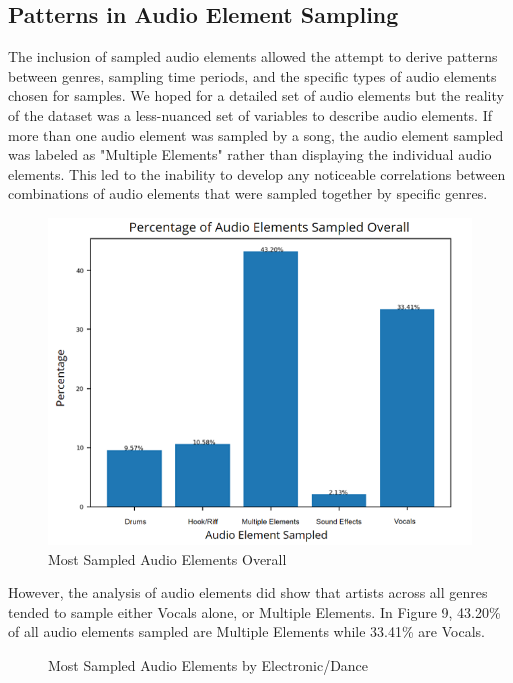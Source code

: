 \documentclass[pageno]{jpaper}
\begin{document}
\subsection{Patterns in Audio Element Sampling}
The inclusion of sampled audio elements allowed the attempt to derive patterns between genres, sampling time periods, and the specific types of audio elements chosen for samples. We hoped for a detailed set of audio elements but the reality of the dataset was a less-nuanced set of variables to describe audio elements. If more than one audio element was sampled by a song, the audio element sampled was labeled as "Multiple Elements" rather than displaying the individual audio elements. This led to the inability to develop any noticeable correlations between combinations of audio elements that were sampled together by specific genres.
\begin{figure}[H]
\centering
\includegraphics{audioElemSampledOverall}
\caption{Most Sampled Audio Elements Overall}
\label{fig:fig9}
\centering
\end{figure}
However, the analysis of audio elements did show that artists across all genres tended to sample either Vocals alone, or Multiple Elements. In Figure 9, 43.20\% of all audio elements sampled are Multiple Elements while 33.41\% are Vocals. 
\begin{figure}[H]
\centering
\caption{Most Sampled Audio Elements by Hip-Hop/R\&B}\caption{Most Sampled Audio Elements by Electronic/Dance}
\label{fig:fig10}
\label{fig:fig11}
\end{figure}
\end{document}
